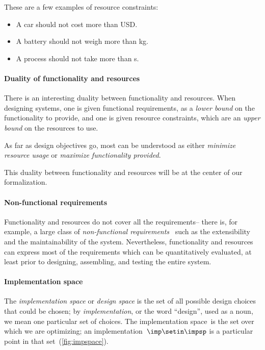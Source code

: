 \begin{example}
    These are a few examples of resource constraints:
    \begin{itemize}
        \item A car should not cost more than \unit[15,000]{USD}.
        \item A battery should not weigh more than \unit[1]{kg}.
        \item A process should not take more than \unit[10]{s}.
    \end{itemize}
\end{example}

\paragraph{Duality of functionality and resources}

There is an interesting duality between functionality and resources.
When designing systems, one is given functional requirements, as a \emph{lower bound} on the functionality to provide,
and one is given resource constraints, which are an \emph{upper bound} on the resources to use.

As far as design objectives go, most can be understood as either \emph{minimize resource usage}
or \emph{maximize functionality provided}.

This duality between functionality and resources will be at the center of our formalization.

\paragraph{Non-functional requirements}

Functionality and resources do not cover all the requirements-- there is, for example, a large class of \emph{non-functional requirements}~\cite{deweck11} such as the extensibility and the maintainability of the system.
Nevertheless, functionality and resources can express most of the requirements which can be quantitatively evaluated, at least prior to designing, assembling, and testing the entire system.

\paragraph{Implementation space}

The \emph{implementation space} or \textit{design space} is the set of all possible design choices that could be chosen; by \textit{implementation}, or the word ``design'', used as a noun, we mean one particular set of choices.
The implementation space~\impsp is the set over which we are optimizing; an implementation~$\imp\setin\impsp$ is a particular point in that set~(\cref{fig:impspace}).

